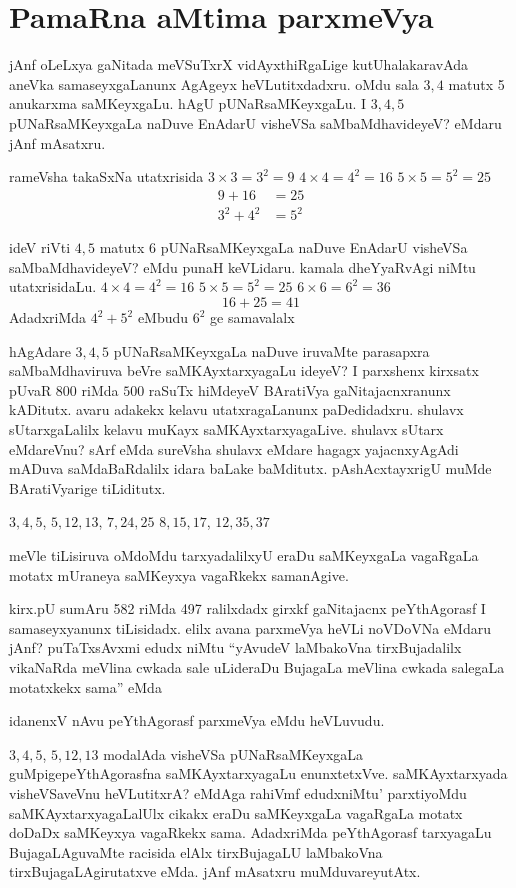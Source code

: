\chapter{PamaRna aMtima parxmeVya}

jAnf oLeLxya gaNitada meVSuTxrX vidAyxthiRgaLige kutUhalakaravAda aneVka samaseyxgaLanunx AgAgeyx heVLutitxdadxru. oMdu sala $3, 4$ matutx {\rm 5} anukarxma saMKeyxgaLu. hAgU pUNaRsaMKeyxgaLu. I $3, 4, 5$ pUNaRsaMKeyxgaLa naDuve EnAdarU visheVSa saMbaMdhavideyeV? eMdaru jAnf mAsatxru.

rameVsha takaSxNa utatxrisida \quad $3\times 3=3^2=9$ \quad $4\times 4=4^2=16$ \quad $5\times 5=5^2=25$  
\begin{align*}
9+16 &=25\\
3^2+4^2&=5^2
\end{align*}

ideV riVti $4, 5$ matutx {\rm 6} pUNaRsaMKeyxgaLa naDuve EnAdarU visheVSa saMbaMdhavideyeV? eMdu punaH keVLidaru. kamala dheYyaRvAgi niMtu utatxrisidaLu. \quad $4\times 4=4^2=16$ \quad $5\times 5=5^2=25$ \quad $6\times 6=6^2=36$  
$$
16+25 =41
$$
AdadxriMda $4^2+5^2$ eMbudu $6^2$ ge samavalalx

hAgAdare $3, 4, 5$ pUNaRsaMKeyxgaLa naDuve iruvaMte parasapxra saMbaMdhaviruva beVre saMKAyxtarxyagaLu ideyeV? I parxshenx kirxsatx pUvaR $800$ riMda $500$ raSuTx hiMdeyeV BAratiVya gaNitajacnxranunx kADitutx. avaru adakekx kelavu utatxragaLanunx paDedidadxru. shulavx sUtarxgaLalilx kelavu muKayx saMKAyxtarxyagaLive. shulavx sUtarx eMdareVnu? sArf eMda sureVsha shulavx eMdare hagagx yajacnxyAgAdi mADuva saMdaBaRdalilx idara baLake baMditutx. pAshAcxtayxrigU muMde BAratiVyarige tiLiditutx.

$3, 4, 5$, \quad $5, 12, 13$, \quad $7, 24, 25$ \quad $8, 15, 17$, \quad $12, 35, 37$

meVle tiLisiruva oMdoMdu tarxyadalilxyU eraDu saMKeyxgaLa vagaRgaLa motatx mUraneya saMKeyxya vagaRkekx samanAgive.

kirx.pU sumAru {\rm 582} riMda {\rm 497} ralilxdadx girxkf gaNitajacnx  peYthAgorasf I samaseyxyanunx tiLisidadx. elilx avana parxmeVya heVLi noVDoVNa eMdaru jAnf? puTaTxsAvxmi edudx niMtu ``yAvudeV laMbakoVna tirxBujadalilx vikaNaRda meVlina cwkada sale uLideraDu BujagaLa meVlina cwkada salegaLa motatxkekx sama'' eMda

idanenxV nAvu peYthAgorasf parxmeVya eMdu heVLuvudu.

 $3,4,5$, $5,12,13$ modalAda visheVSa pUNaRsaMKeyxgaLa guMpige\break peYthAgorasfna saMKAyxtarxyagaLu enunxtetxVve. saMKAyxtarxyada visheVSaveVnu \-heVLutitxrA? eMdAga rahiVmf edudxniMtu' parxtiyoMdu saMKAyxtarxyagaLalUlx cikakx eraDu saMKeyx\-gaLa vagaRgaLa motatx doDaDx saMKeyxya vagaRkekx sama. AdadxriMda peYthAgorasf tarxyagaLu BujagaLAguvaMte racisida elAlx tirxBujagaLU laMbakoVna tirxBujagaLAgirutatxve eMda. jAnf mAsatxru muMduvareyutAtx.

